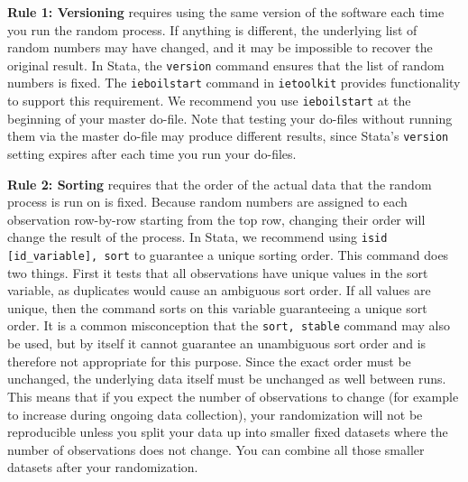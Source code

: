 \textbf{Rule 1: Versioning} requires using the same version of the software each time you run the random process.
If anything is different, the underlying list of random numbers may have changed,
and it may be impossible to recover the original result.
In Stata, the \texttt{version} command ensures that the list of random numbers is fixed.
The \texttt{ieboilstart} command in \texttt{ietoolkit} provides functionality to support this requirement.
We recommend you use \texttt{ieboilstart} at the beginning of your master do-file.
Note that testing your do-files without running them
via the master do-file may produce different results,
since Stata's \texttt{version} setting expires after each time you run your do-files.

\textbf{Rule 2: Sorting} requires that the order of the actual data that the random process is run on is fixed.
Because random numbers are assigned to each observation row-by-row starting from
the top row,
changing their order will change the result of the process.
In Stata, we recommend using \texttt{isid [id\_variable], sort}
to guarantee a unique sorting order.
This command does two things.
First it tests that all observations have unique values in the sort variable,
as duplicates would cause an ambiguous sort order.
If all values are unique,
then the command sorts on this variable guaranteeing a unique sort order.
It is a common misconception that the \texttt{sort, stable} command
may also be used,
but by itself it cannot guarantee an unambiguous sort order
and is therefore not appropriate for this purpose.
Since the exact order must be unchanged,
the underlying data itself must be unchanged as well between runs.
This means that if you expect the number of observations to change
(for example to increase during ongoing data collection),
your randomization will not be reproducible unless you split your data up into
smaller fixed datasets where the number of observations does not change.
You can combine all
those smaller datasets after your randomization.


